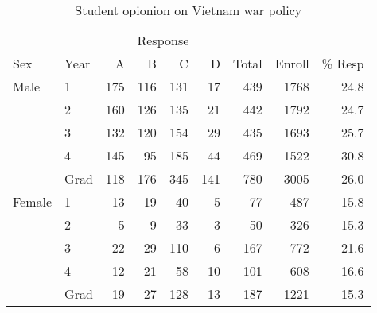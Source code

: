 \begin{table}[htb]
 \caption{Student opionion on Vietnam war policy}\label{tab:vietnam1}
 \begin{center}
 \begin{tabular}{ll rrrr rrr}
  \hline
       &       &  \multicolumn{4}{c}{Response} \\ \cline{3-6}
Sex    & Year  &   A  &  B  &  C  &  D  & Total & Enroll & \% Resp \\ \hline
Male   & 1     &  175 & 116 & 131 &  17 & 439 & 1768 & 24.8 \\ 
       & 2     &  160 & 126 & 135 &  21 & 442 & 1792 & 24.7 \\ 
       & 3     &  132 & 120 & 154 &  29 & 435 & 1693 & 25.7 \\ 
       & 4     &  145 &  95 & 185 &  44 & 469 & 1522 & 30.8 \\ 
       & Grad  &  118 & 176 & 345 & 141 & 780 & 3005 & 26.0 \\[.5ex] 
Female & 1     &   13 &  19 &  40 &   5 &  77 &  487 & 15.8 \\ 
       & 2     &    5 &   9 &  33 &   3 &  50 &  326 & 15.3 \\ 
       & 3     &   22 &  29 & 110 &   6 & 167 &  772 & 21.6 \\ 
       & 4     &   12 &  21 &  58 &  10 & 101 &  608 & 16.6 \\ 
       & Grad  &   19 &  27 & 128 &  13 & 187 & 1221 & 15.3 \\ 
  \hline
 \end{tabular}
 \end{center}
\end{table}
